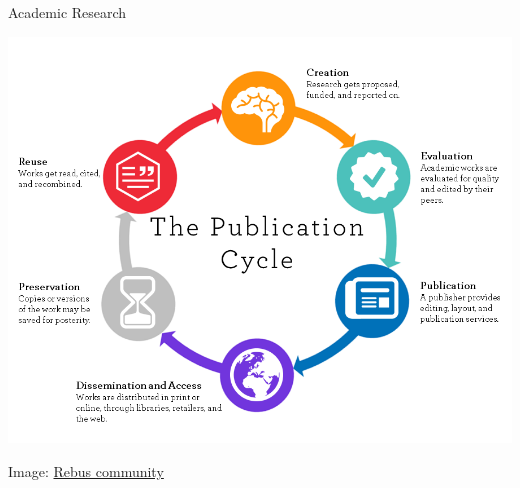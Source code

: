 \documentclass{beamer} %
\begin{document}
  \begin{frame}{Academic Research}
    \begin{center}
      \includegraphics[height=.8\textheight]{publication_cycle.png}
    \end{center}
    \tiny{Image: \href{https://press.rebus.community/literaturereviewsedunursing/chapter/chapter-2-what-is-a-literature-review/}{Rebus community}}
  \end{frame}
\end{document}
